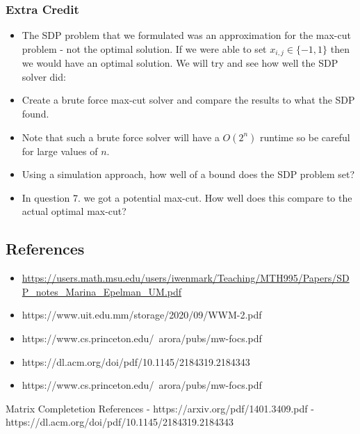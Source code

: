 \documentclass{article}
\begin{document}
\subsubsection{Extra Credit}
\begin{itemize}
\item\label{item:1} The SDP problem that we formulated was an approximation for the max-cut problem - not the optimal solution. If we were able to set \( x_{i, j} \in \{ -1, 1 \} \) then we would have an optimal solution. We will try and see how well the SDP solver did:
\item\label{item:2}
Create a brute force max-cut solver and compare the results to what the SDP found.
\item\label{item:3}
Note that such a brute force solver will have a \( O(2^n) \) runtime so be careful for large values of \( n \).
\item\label{item:4}
Using a simulation approach, how well of a bound does the SDP problem set?
\item\label{item:5}
In question 7. we got a potential max-cut. How well does this compare to the actual optimal max-cut?
\end{itemize}



\newpage
\subsection{References}
\begin{itemize}
\item
\url{https://users.math.msu.edu/users/iwenmark/Teaching/MTH995/Papers/SDP_notes_Marina_Epelman_UM.pdf}
\item https://www.uit.edu.mm/storage/2020/09/WWM-2.pdf
\item https://www.cs.princeton.edu/~arora/pubs/mw-focs.pdf
\item https://dl.acm.org/doi/pdf/10.1145/2184319.2184343
\item https://www.cs.princeton.edu/~arora/pubs/mw-focs.pdf
\end{itemize}

Matrix Completetion References
- https://arxiv.org/pdf/1401.3409.pdf 
- https://dl.acm.org/doi/pdf/10.1145/2184319.2184343 
\end{document}
